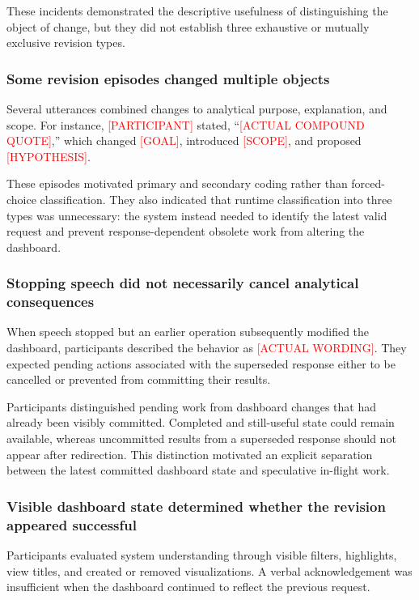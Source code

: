 \documentclass[journal]{IEEEtran}
\begin{document}
These incidents demonstrated the descriptive usefulness of distinguishing
the object of change, but they did not establish three exhaustive or mutually
exclusive revision types.

\subsubsection{Some revision episodes changed multiple objects}

Several utterances combined changes to analytical purpose, explanation, and
scope. For instance, \textcolor{red}{[PARTICIPANT]} stated,
``\textcolor{red}{[ACTUAL COMPOUND QUOTE]},'' which changed
\textcolor{red}{[GOAL]}, introduced \textcolor{red}{[SCOPE]}, and proposed
\textcolor{red}{[HYPOTHESIS]}.

These episodes motivated primary and secondary coding rather than
forced-choice classification. They also indicated that runtime classification
into three types was unnecessary: the system instead needed to identify the
latest valid request and prevent response-dependent obsolete work from
altering the dashboard.

\subsubsection{Stopping speech did not necessarily cancel analytical consequences}

When speech stopped but an earlier operation subsequently modified the
dashboard, participants described the behavior as
\textcolor{red}{[ACTUAL WORDING]}. They expected pending actions associated
with the superseded response either to be cancelled or prevented from
committing their results.

Participants distinguished pending work from dashboard changes that had
already been visibly committed. Completed and still-useful state could remain
available, whereas uncommitted results from a superseded response should not
appear after redirection. This distinction motivated an explicit separation
between the latest committed dashboard state and speculative in-flight work.

\subsubsection{Visible dashboard state determined whether the revision appeared successful}

Participants evaluated system understanding through visible filters,
highlights, view titles, and created or removed visualizations. A verbal
acknowledgement was insufficient when the dashboard continued to reflect the
previous request.
\end{document}
